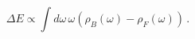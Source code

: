 \begin{equation}
\Delta E\propto \int d\omega\, \omega (\rho_B(\omega ) - \rho_F(\omega ))
\,.\label{DEspectdens}
\end{equation}

